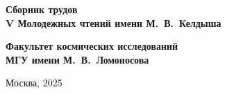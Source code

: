 \documentclass[10pt,reqno,intlimits,twoside]{amsart}
\begin{document}
    \thispagestyle{empty}
    \begin{center}
    \Huge     {\textbf{Сборник трудов}}\\
        \bigskip
    \LARGE     {\textbf {V Молодежных чтений имени М.~В.~Келдыша}}
    \end{center}
   \vspace{6cm}
   \begin{center}
    \LARGE    {\textbf {Факультет космических исследований\\ 
       МГУ имени М.~В.~Ломоносова}}
   \end{center}
    \vspace*{\fill}
    \begin{center}
        \large {Москва, 2025}
    \end{center}
    \newpage
    \tableofcontents
    \newpage
    
    

    
\end{document}
